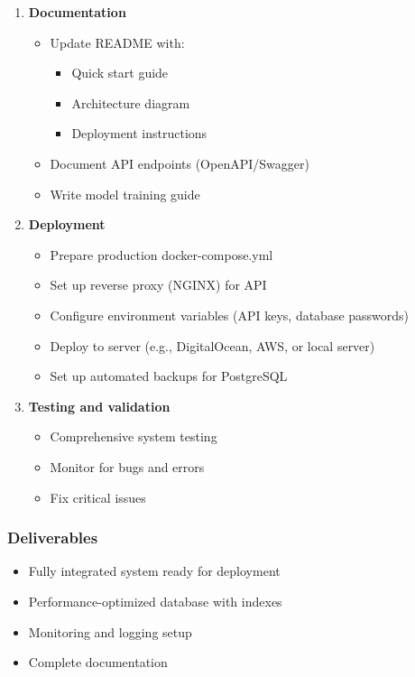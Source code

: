 \documentclass[12pt,a4paper]{article}
\begin{document}
\begin{enumerate}
    \item \textbf{Documentation}
    \begin{itemize}
        \item Update README with:
        \begin{itemize}
            \item Quick start guide
            \item Architecture diagram
            \item Deployment instructions
        \end{itemize}
        \item Document API endpoints (OpenAPI/Swagger)
        \item Write model training guide
    \end{itemize}
    
    \item \textbf{Deployment}
    \begin{itemize}
        \item Prepare production docker-compose.yml
        \item Set up reverse proxy (NGINX) for API
        \item Configure environment variables (API keys, database passwords)
        \item Deploy to server (e.g., DigitalOcean, AWS, or local server)
        \item Set up automated backups for PostgreSQL
    \end{itemize}
    
    \item \textbf{Testing and validation}
    \begin{itemize}
        \item Comprehensive system testing
        \item Monitor for bugs and errors
        \item Fix critical issues
    \end{itemize}
\end{enumerate}

\subsubsection{Deliverables}
\begin{itemize}
    \item Fully integrated system ready for deployment
    \item Performance-optimized database with indexes
    \item Monitoring and logging setup
    \item Complete documentation
\end{itemize}
\end{document}
